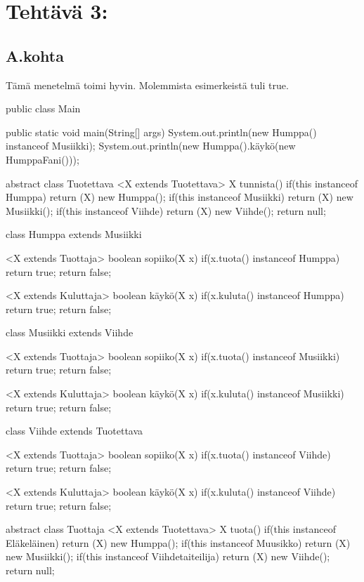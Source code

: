 \chapter{Tehtävä 3: 
\label{chap:Teht=0000E4v=0000E4-2}}

\section{A.kohta}
\label{}

Tämä menetelmä toimi hyvin. Molemmista esimerkeistä tuli true.

\begin{javacode}
public class Main {

  public static void main(String[] args) {
    System.out.println(new Humppa() instanceof Musiikki);
    System.out.println(new Humppa().käykö(new HumppaFani()));
  }

}

abstract class Tuotettava{
  <X extends Tuotettava> X tunnista() {
    if(this instanceof Humppa) {
      return (X) new Humppa();
    }
    if(this instanceof Musiikki) {
      return (X) new Musiikki();
    }
    if(this instanceof Viihde) {
      return (X) new Viihde();
    }
    return null;
  }
}

class Humppa extends Musiikki{
  <X extends Tuottaja> boolean sopiiko(X x) {
    if(x.tuota() instanceof Humppa) {
      return true;
    }
    return false;
  }
  
  <X extends Kuluttaja> boolean käykö(X x) {
    if(x.kuluta() instanceof Humppa) {
      return true;
    }
    return false;
  }
}

class Musiikki extends Viihde{
  <X extends Tuottaja> boolean sopiiko(X x) {
    if(x.tuota() instanceof Musiikki) {
      return true;
    }
    return false;
  }
  
  <X extends Kuluttaja> boolean käykö(X x) {
    if(x.kuluta() instanceof Musiikki) {
      return true;
    }
    return false;
  }
}

class Viihde extends Tuotettava{
  <X extends Tuottaja> boolean sopiiko(X x) {
    if(x.tuota() instanceof Viihde) {
      return true;
    }
    return false;
  }
  
  <X extends Kuluttaja> boolean käykö(X x) {
    if(x.kuluta() instanceof Viihde) {
      return true;
    }
    return false;
  }
}

abstract class Tuottaja{
  <X extends Tuotettava> X tuota() {
    if(this instanceof Eläkeläinen) {
      return (X) new Humppa();
    }
    if(this instanceof Muusikko) {
      return (X) new Musiikki();
    }
    if(this instanceof Viihdetaiteilija) {
      return (X) new Viihde();
    }
    return null;
  }
}


\end{javacode}
